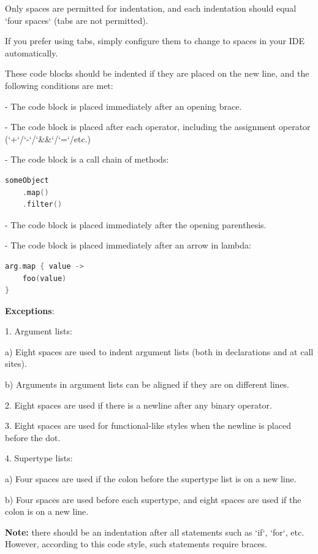 Only spaces are permitted for indentation, and each indentation should equal `four spaces` (tabs are not permitted).

If you prefer using tabs, simply configure them to change to spaces in your IDE automatically.

These code blocks should be indented if they are placed on the new line, and the following conditions are met:

-	The code block is placed immediately after an opening brace.

-	The code block is placed after each operator, including the assignment operator (`+`/`-`/`\&\&`/`=`/etc.)

-	The code block is a call chain of methods:

\begin{lstlisting}[language=Kotlin]
someObject
    .map()
    .filter()
\end{lstlisting}
-  The code block is placed immediately after the opening parenthesis.

-  The code block is placed immediately after an arrow in lambda:



\begin{lstlisting}[language=Kotlin]
arg.map { value ->
    foo(value)
}
\end{lstlisting}
    

\textbf{Exceptions}:

1.	Argument lists: \

a) Eight spaces are used to indent argument lists (both in declarations and at call sites). \

b) Arguments in argument lists can be aligned if they are on different lines. 



2.	Eight spaces are used if there is a newline after any binary operator.



3.	Eight spaces are used for functional-like styles when the newline is placed before the dot.



4.	Supertype lists: \

a) Four spaces are used if the colon before the supertype list is on a new line. \

b) Four spaces are used before each supertype, and eight spaces are used if the colon is on a new line. 



\textbf{Note:} there should be an indentation after all statements such as `if`, `for`, etc. However, according to this code style, such statements require braces. 



